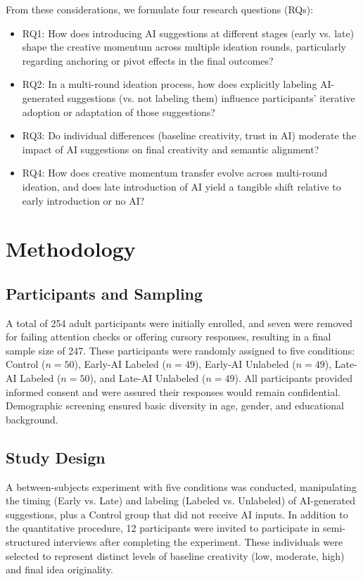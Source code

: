 \documentclass{article}
\begin{document}
From these considerations, we formulate four research questions (RQs):
\begin{itemize}
    \item RQ1: How does introducing AI suggestions at different stages (early vs. late) shape the creative momentum across multiple ideation rounds, particularly regarding anchoring or pivot effects in the final outcomes?
    \item RQ2: In a multi-round ideation process, how does explicitly labeling AI-generated suggestions (vs. not labeling them) influence participants’ iterative adoption or adaptation of those suggestions?
    \item RQ3: Do individual differences (baseline creativity, trust in AI) moderate the impact of AI suggestions on final creativity and semantic alignment?
    \item RQ4: How does creative momentum transfer evolve across multi-round ideation, and does late introduction of AI yield a tangible shift relative to early introduction or no AI?
\end{itemize}

\section{Methodology}
\subsection{Participants and Sampling}
 A total of 254 adult participants were initially enrolled, and seven were removed for failing attention checks or offering cursory responses, resulting in a final sample size of 247. These participants were randomly assigned to five conditions: Control ($n=50$), Early-AI Labeled ($n=49$), Early-AI Unlabeled ($n=49$), Late-AI Labeled ($n=50$), and Late-AI Unlabeled ($n=49$). All participants provided informed consent and were assured their responses would remain confidential. Demographic screening ensured basic diversity in age, gender, and educational background.
\subsection{Study Design}
 A between-subjects experiment with five conditions was conducted, manipulating the timing (Early vs. Late) and labeling (Labeled vs. Unlabeled) of AI-generated suggestions, plus a Control group that did not receive AI inputs. In addition to the quantitative procedure, 12 participants were invited to participate in semi-structured interviews after completing the experiment. These individuals were selected to represent distinct levels of baseline creativity (low, moderate, high) and final idea originality.
\end{document}
